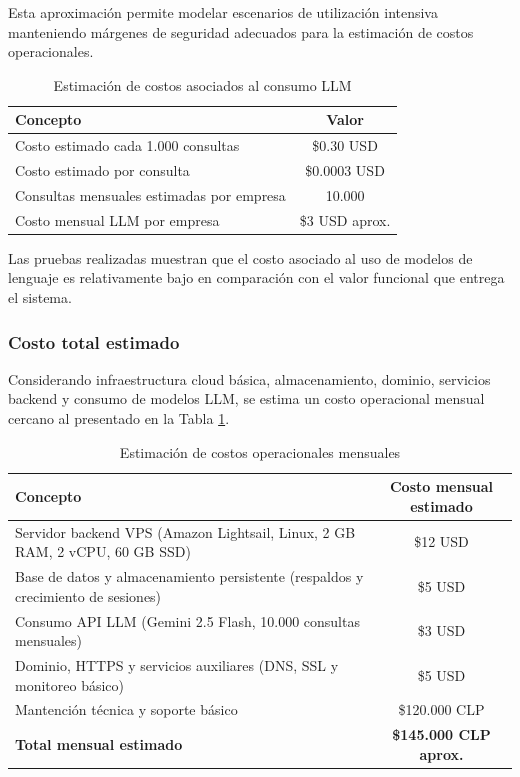Esta aproximación permite modelar escenarios de utilización intensiva manteniendo márgenes de seguridad adecuados para la estimación de costos operacionales.

\begin{table}[H]
\centering
\begin{tabular}{|l|c|}
\hline
Concepto & Valor \\ \hline
Costo estimado cada 1.000 consultas & \$0.30 USD \\ \hline
Costo estimado por consulta & \$0.0003 USD \\ \hline
Consultas mensuales estimadas por empresa & 10.000 \\ \hline
Costo mensual LLM por empresa & \$3 USD aprox. \\ \hline
\end{tabular}
\caption{Estimación de costos asociados al consumo LLM}
\end{table}

Las pruebas realizadas muestran que el costo asociado al uso de modelos de lenguaje es relativamente bajo en comparación con el valor funcional que entrega el sistema.

\subsubsection{Costo total estimado}

Considerando infraestructura cloud básica, almacenamiento, dominio, servicios backend y consumo de modelos LLM, se estima un costo operacional mensual cercano al presentado en la Tabla \ref{tab:costos_operacionales}.

\begin{table}[H]
\centering
\begin{tabular}{|p{8cm}|c|}
\hline
Concepto & Costo mensual estimado \\ \hline

Servidor backend VPS (Amazon Lightsail, Linux, 2 GB RAM, 2 vCPU, 60 GB SSD) \parencite{aws_lightsail_pricing} & \$12 USD \\ \hline

Base de datos y almacenamiento persistente (respaldos y crecimiento de sesiones) & \$5 USD \\ \hline

Consumo API LLM (Gemini 2.5 Flash, 10.000 consultas mensuales) & \$3 USD \\ \hline

Dominio, HTTPS y servicios auxiliares (DNS, SSL y monitoreo básico) & \$5 USD \\ \hline

Mantención técnica y soporte básico & \$120.000 CLP \\ \hline

\textbf{Total mensual estimado} & \textbf{\$145.000 CLP aprox.} \\ \hline

\end{tabular}
\caption{Estimación de costos operacionales mensuales}
\label{tab:costos_operacionales}
\end{table}


